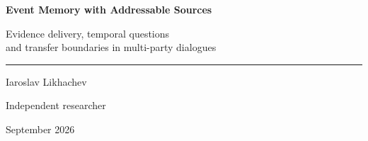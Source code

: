 \documentclass[11pt,a4paper]{article}
\begin{document}
\thispagestyle{empty}
\begin{center}
{\sffamily\bfseries\fontsize{15.5}{19.22}\selectfont
Event Memory with Addressable Sources\par}
\vspace{3.4mm}
{\sffamily\color{gray}\fontsize{11}{14}\selectfont
Evidence delivery, temporal questions\\ and transfer boundaries in multi-party dialogues\par}
\vspace{5mm}
{\color{gray}\rule{.16\linewidth}{.4pt}}
\vspace{4mm}

{\sffamily\fontsize{10.8}{13}\selectfont Iaroslav Likhachev\par}
\vspace{1.2mm}
{\sffamily\color{gray}\fontsize{9.4}{12}\selectfont Independent researcher\par}
\vspace{1.2mm}
{\sffamily\color{gray}\fontsize{9}{11} September 2026\par}
\end{center}
\vspace{-3mm}
\end{document}
